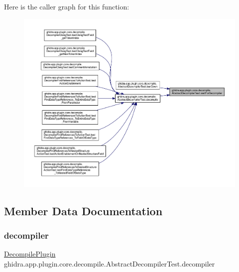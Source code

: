 Here is the caller graph for this function\+:
\nopagebreak
\begin{figure}[H]
\begin{center}
\leavevmode
\includegraphics[width=350pt]{classghidra_1_1app_1_1plugin_1_1core_1_1decompile_1_1_abstract_decompiler_test_ab9c1e094ec0742fb4eede3b741d00987_icgraph}
\end{center}
\end{figure}


\subsection{Member Data Documentation}
\mbox{\label{classghidra_1_1app_1_1plugin_1_1core_1_1decompile_1_1_abstract_decompiler_test_a010f6fcc038baad5ee92546adaaae87c}} 
\subsubsection{\texorpdfstring{decompiler}{decompiler}}
{\footnotesize\ttfamily \mbox{\hyperlink{classghidra_1_1app_1_1plugin_1_1core_1_1decompile_1_1_decompile_plugin}{Decompile\+Plugin}} ghidra.\+app.\+plugin.\+core.\+decompile.\+Abstract\+Decompiler\+Test.\+decompiler\hspace{0.3cm}{\ttfamily [protected]}}



